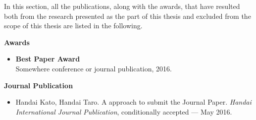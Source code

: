 In this section, all the publications, along with the awards, that have resulted both from the research presented as the part of this thesis and excluded from the scope of this thesis are listed in the following. 
\vspace{7px}

{\bf \Large Awards}
	\begin{itemize}
		\item \textbf{Best Paper Award} \\ 
		Somewhere conference or journal publication, 2016.
	\end{itemize}
	\vspace{7px}
	
{\bf \Large Journal Publication}
	\begin{itemize}
		\item Handai Kato, Handai Taro. 
		A approach to submit the Journal Paper. 
		\textit{Handai International Journal Publication}, conditionally accepted --- May 2016.
	\end{itemize}